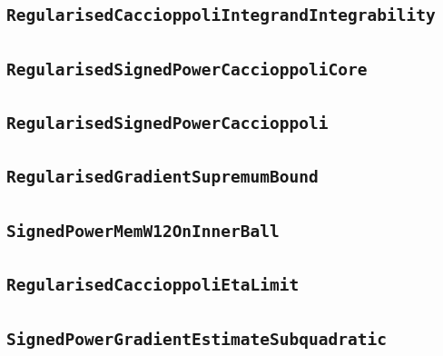 \documentclass[11pt]{amsart}
\theoremstyle{definition}
\begin{document}
\subsection{\texorpdfstring{\texttt{RegularisedCaccioppoliIntegrandIntegrability}}{RegularisedCaccioppoliIntegrandIntegrability}}\label{node:RegularisedCaccioppoliIntegrandIntegrability}


\subsection{\texorpdfstring{\texttt{RegularisedSignedPowerCaccioppoliCore}}{RegularisedSignedPowerCaccioppoliCore}}\label{node:RegularisedSignedPowerCaccioppoliCore}


\subsection{\texorpdfstring{\texttt{RegularisedSignedPowerCaccioppoli}}{RegularisedSignedPowerCaccioppoli}}\label{node:RegularisedSignedPowerCaccioppoli}


\subsection{\texorpdfstring{\texttt{RegularisedGradientSupremumBound}}{RegularisedGradientSupremumBound}}\label{node:RegularisedGradientSupremumBound}


\subsection{\texorpdfstring{\texttt{SignedPowerMemW12OnInnerBall}}{SignedPowerMemW12OnInnerBall}}\label{node:SignedPowerMemW12OnInnerBall}


\subsection{\texorpdfstring{\texttt{RegularisedCaccioppoliEtaLimit}}{RegularisedCaccioppoliEtaLimit}}\label{node:RegularisedCaccioppoliEtaLimit}


\subsection{\texorpdfstring{\texttt{SignedPowerGradientEstimateSubquadratic}}{SignedPowerGradientEstimateSubquadratic}}\label{node:SignedPowerGradientEstimateSubquadratic}

\end{document}
